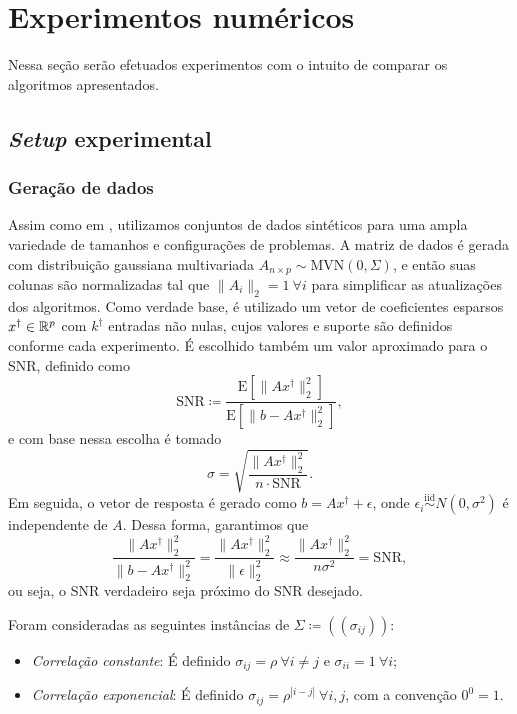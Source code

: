 \section{Experimentos numéricos}
Nessa seção serão efetuados experimentos com o intuito de comparar os algoritmos apresentados. 

\subsection{\textit{Setup} experimental}\label{sec:setup}
\subsubsection{Geração de dados}
Assim como em \cite{fastselect}, utilizamos conjuntos de dados sintéticos para uma ampla variedade de tamanhos e configurações de problemas. A matriz de dados é gerada com distribuição gaussiana multivariada $A_{n \times p} \sim \text{MVN}(0, \Sigma)$, e então suas colunas são normalizadas tal que $\|A_i\|_2=1\ \forall i$ para simplificar as atualizações dos algoritmos. Como verdade base, é utilizado um vetor de coeficientes esparsos $x^\dagger\in\mathbb{R}^p$ com $k^\dagger$ entradas não nulas, cujos valores e suporte são definidos conforme cada experimento. É escolhido também um valor aproximado para o SNR, definido como 
\[\text{SNR} \coloneq \frac{\text{E}[\|Ax^\dagger\|_2^2]}{\text{E}[\|b-Ax^\dagger\|_2^2]},\]
e com base nessa escolha é tomado 
\[\sigma = \sqrt{\frac{\|Ax^\dagger\|_2^2}{n\cdot\text{SNR}}}.\]
Em seguida, o vetor de resposta é gerado como $b = Ax^\dagger + \epsilon$, onde $\epsilon_i \stackrel{\text{iid}}{\sim} N(0, \sigma^2)$ é independente de $A$. Dessa forma, garantimos que 
\[\frac{\|Ax^\dagger\|_2^2}{\|b-Ax^\dagger\|_2^2} = \frac{\|Ax^\dagger\|_2^2}{\|\epsilon\|_2^2}\approx \frac{\|Ax^\dagger\|_2^2}{n\sigma^2}= \text{SNR},\]
ou seja, o SNR verdadeiro seja próximo do SNR desejado.   

Foram consideradas as seguintes instâncias de $\Sigma \coloneq ((\sigma_{ij}))$:
\begin{itemize}
  \item \textit{Correlação constante}: É definido $\sigma_{ij} = \rho\ \forall i \neq j$ e $\sigma_{ii} = 1\ \forall i$;
  \item \textit{Correlação exponencial}: É definido $\sigma_{ij} = \rho^{|i-j|}\ \forall i, j$, com a convenção $0^0 = 1$.
\end{itemize}

